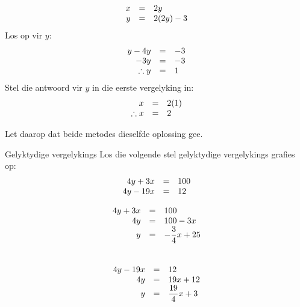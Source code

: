 \begin{aktiwiteit}{}
\begin{equation*}
\begin{array}{ccl}\hfill x& =& 2y\hfill \\
 \hfill y& =& 2(2y)-3\hfill 
\end{array}
\end{equation*}
Los op vir $y$:
\begin{equation*}
\begin{array}{ccl}
 \hfill y-4y& =& -3\hfill \\
 \hfill -3y& =& -3\hfill \\ 
\hfill \therefore y& =& 1\hfill 
\end{array}
\end{equation*}
Stel die antwoord vir $y$ in die eerste vergelyking in:
\begin{equation*}
\begin{array}{ccl}
 \hfill x& =& 2(1)\hfill \\
 \therefore x&=& 2\hfill \end{array}
\end{equation*}

Let daarop dat beide metodes dieselfde oplossing gee.

\begin{wex}
{Gelyktydige vergelykings }
{Los die volgende stel gelyktydige vergelykings grafies op:
\begin{equation*}
\begin{array}{ccl}\hfill 4y+3x& =& 100\hfill \\ \hfill 4y-19x& =& 12\hfill \end{array}
\end{equation*}
}
{

\begin{equation*}
\begin{array}{ccl}\hfill 4y+3x& =& 100\hfill \\
 \hfill 4y& =& 100-3x\hfill \\
 \hfill y& =& -\dfrac{3}{4}x + 25\hfill \end{array}
\end{equation*}
\\
\begin{equation*}
\begin{array}{ccl}\hfill 4y-19x& =& 12\hfill \\ \hfill 4y& =& 19x+12\hfill \\ \hfill y& =& \dfrac{19}{4}x+3\hfill \end{array}
\end{equation*}



}
\end{wex}
\end{aktiwiteit}
